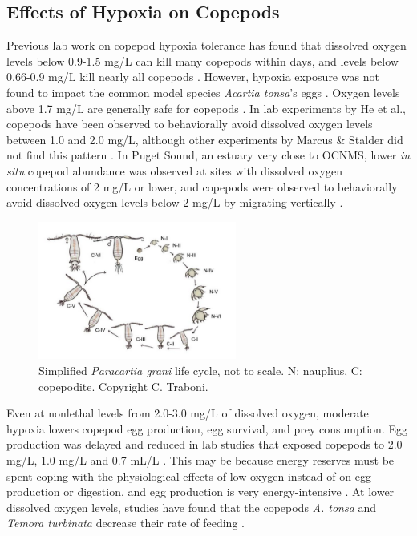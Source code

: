 \documentclass[12pt,twoside]{reedthesis}
\begin{document}
{\subsection{Effects of Hypoxia on Copepods}

Previous lab work on copepod hypoxia tolerance has found that dissolved oxygen levels below 0.9-1.5 mg/L can kill many copepods within days, and levels below 0.66-0.9 mg/L kill nearly all copepods \autocite{He2021, Marcus2004, Stalder1997, Grodzins2016}. However, hypoxia exposure was not found to impact the common model species \textit{Acartia tonsa}'s eggs \autocite{Invidia2004}. Oxygen levels above 1.7 mg/L are generally safe for copepods \autocite{Grodzins2016}. In lab experiments by He et al., copepods have been observed to behaviorally avoid dissolved oxygen levels between 1.0 and 2.0 mg/L, although other experiments by Marcus \& Stalder did not find this pattern \autocite{He2021, Stalder1997}. In Puget Sound, an estuary very close to OCNMS, lower \textit{in situ} copepod abundance was observed at sites with dissolved oxygen concentrations of 2 mg/L or lower, and copepods were observed to behaviorally avoid dissolved oxygen levels below 2 mg/L by migrating vertically \autocite{Keister2020, Keister2013}. 

\begin{figure}
	\begin{center}
		\includegraphics[width=0.58\textwidth]{Fig_Life_cycle}
		\caption[Life cycle of copepods]{\footnotesize{Simplified \textit{Paracartia grani} life cycle, not to scale. N: nauplius, C: copepodite. Copyright C. Traboni. }} %
		\label{LifeCycle}
	\end{center}
\end{figure} 

Even at nonlethal levels from 2.0-3.0 mg/L of dissolved oxygen, moderate hypoxia lowers copepod egg production, egg survival, and prey consumption. Egg production was delayed and reduced in lab studies that exposed copepods to 2.0 mg/L, 1.0 mg/L and 0.7 mL/L \autocite{Marcus2004, Richmond2006, Roman1993}. This may be because energy reserves must be spent coping with the physiological effects of low oxygen instead of on egg production or digestion, and egg production is very energy-intensive \autocite{Marcus2004, Elliott2013, Lutz1992, Stalder1997, Roff1992}. At lower dissolved oxygen levels, studies have found that the copepods \textit{A. tonsa} and \textit{Temora turbinata} decrease their rate of feeding \autocite{He2021, Elliott2013}. 

}
\end{document}
